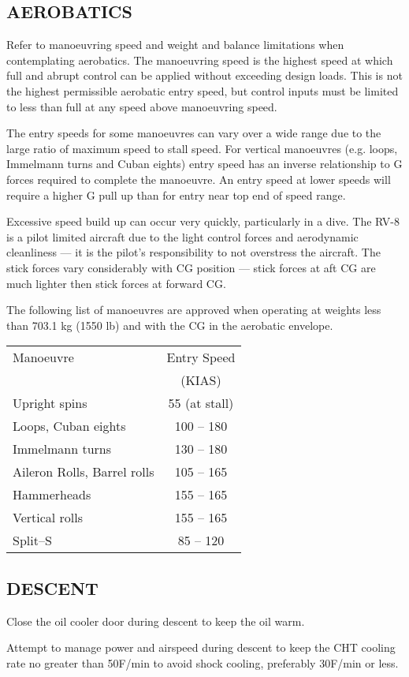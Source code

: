 \subsection{AEROBATICS}

Refer to manoeuvring speed and weight and balance limitations when
contemplating aerobatics. The manoeuvring speed is the highest speed at
which full and abrupt control can be applied without exceeding design
loads. This is not the highest permissible aerobatic entry speed, but
control inputs must be limited to less than full at any speed above
manoeuvring speed.

The entry speeds for some manoeuvres can vary over a wide range due
to the large ratio of maximum speed to stall speed. For vertical manoeuvres
(e.g. loops, Immelmann turns and Cuban eights) entry speed has
an inverse relationship to G forces required to complete the manoeuvre.
An entry speed at lower speeds will require a higher G pull up than
for entry near top end of speed range. 

\begin{Note}[WARNING]
Excessive speed build up can occur very quickly, particularly in a
dive. The RV-8 is a pilot limited aircraft due to the light control
forces and aerodynamic cleanliness --- it is the pilot's responsibility
 to not overstress the aircraft. The stick forces vary considerably
with CG position --- stick forces at aft CG are much lighter then stick
forces at forward CG.
\end{Note}

\begin{Note}
The following list of manoeuvres are approved 
when operating at weights less than 703.1 kg (1550 lb) and with the
CG in the aerobatic envelope. 
\end{Note}

\begin{center}\begin{tabular}{lc}
Manoeuvre&
Entry Speed\tabularnewline
&
(KIAS)\tabularnewline
Upright spins&55 (at stall)\tabularnewline
Loops, Cuban eights&
100 -- 180\tabularnewline
Immelmann turns&
130 -- 180\tabularnewline
Aileron Rolls, Barrel rolls&
105 -- 165\tabularnewline
Hammerheads&
155 -- 165\tabularnewline
Vertical rolls&
155 -- 165\tabularnewline
Split--S&
85 -- 120\tabularnewline
\end{tabular}\end{center}

\subsection{DESCENT}
Close the oil cooler door during descent to keep the oil warm.
\begin{Note} 
Attempt to manage power and airspeed during descent to keep the CHT cooling rate no greater than 50\textdegree F/min to avoid shock cooling, preferably 30\textdegree F/min or less.
\end{Note}


